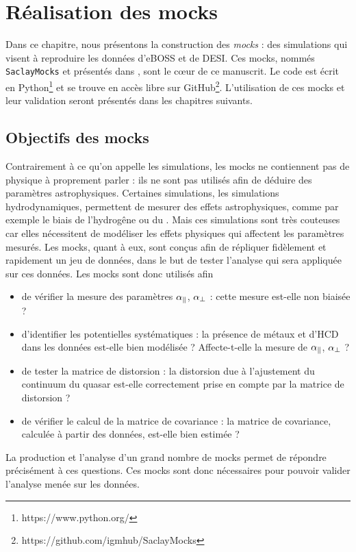 \documentclass[11pt, twoside, a4paper, openright]{report}
\begin{document}

\graphicspath{ {../figures/mocks/} }

\chapter{Réalisation des mocks}
\minitoc
\newpage
\thispagestyle{fancy}

Dans ce chapitre, nous présentons la construction des \emph{mocks} : des simulations qui visent à reproduire les données d'eBOSS et de DESI. Ces mocks, nommés \texttt{SaclayMocks} et présentés dans \citet{CITE:mocks}, sont le c{\oe}ur de ce manuscrit. Le code est écrit en Python\footnote{https://www.python.org/} et se trouve en accès libre sur GitHub\footnote{https://github.com/igmhub/SaclayMocks}. L'utilisation de ces mocks et leur validation seront présentés dans les chapitres suivants.

\section{Objectifs des mocks}
Contrairement à ce qu'on appelle les simulations, les mocks ne contiennent pas de physique à proprement parler : ils ne sont pas utilisés afin de déduire des paramètres astrophysiques. Certaines simulations, les simulations hydrodynamiques, permettent de mesurer des effets astrophysiques, comme par exemple le biais de l'hydrogêne ou du \lya{}. Mais ces simulations sont très couteuses car elles nécessitent de modéliser les effets physiques qui affectent les paramètres mesurés.
Les mocks, quant à eux, sont conçus afin de répliquer fidèlement et rapidement un jeu de données, dans le but de tester l'analyse qui sera appliquée sur ces données.
Les mocks sont donc utilisés afin
\begin{itemize}[label=$\bullet$]
\item de vérifier la mesure des paramètres $\alpha_{\parallel}{}$, $\alpha_{\perp}{}$ : cette mesure est-elle non biaisée ?
\item d'identifier les potentielles systématiques : la présence de métaux et d'HCD dans les données est-elle bien modélisée ? Affecte-t-elle la mesure de $\alpha_{\parallel}{}$, $\alpha_{\perp}{}$ ?
\item de tester la matrice de distorsion : la distorsion due à l'ajustement du continuum du quasar est-elle correctement prise en compte par la matrice de distorsion ?
\item de vérifier le calcul de la matrice de covariance : la matrice de covariance, calculée à partir des données, est-elle bien estimée ?
\end{itemize}
La production et l'analyse d'un grand nombre de mocks permet de répondre précisément à ces questions. Ces mocks sont donc nécessaires pour pouvoir valider l'analyse menée sur les données.
\end{document}
